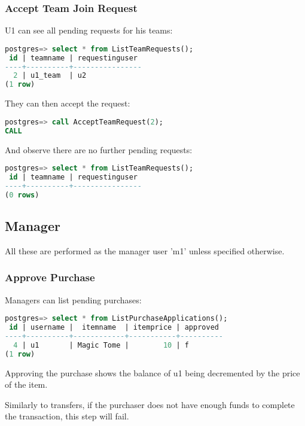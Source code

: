 \subsubsection{Accept Team Join Request}

U1 can see all pending requests for his teams:

\begin{lstlisting}[language=SQL]
postgres=> select * from ListTeamRequests();
 id | teamname | requestinguser 
----+----------+----------------
  2 | u1_team  | u2
(1 row)
\end{lstlisting}


They can then accept the request:

\begin{lstlisting}[language=SQL]
postgres=> call AcceptTeamRequest(2);
CALL
\end{lstlisting}

And observe there are no further pending requests:

\begin{lstlisting}[language=SQL]
postgres=> select * from ListTeamRequests();
 id | teamname | requestinguser 
----+----------+----------------
(0 rows)
\end{lstlisting}

\subsection{Manager}

All these are performed as the manager user 'm1' unless specified otherwise.

\subsubsection{Approve Purchase}

Managers can list pending purchases:

\begin{lstlisting}[language=SQL]
postgres=> select * from ListPurchaseApplications();
 id | username |  itemname  | itemprice | approved 
----+----------+------------+-----------+----------
  4 | u1       | Magic Tome |        10 | f
(1 row)
\end{lstlisting}

Approving the purchase shows the balance of u1 being decremented by the price of the item.

Similarly to transfers, if the purchaser does not have enough funds to complete the transaction, this step will fail.

